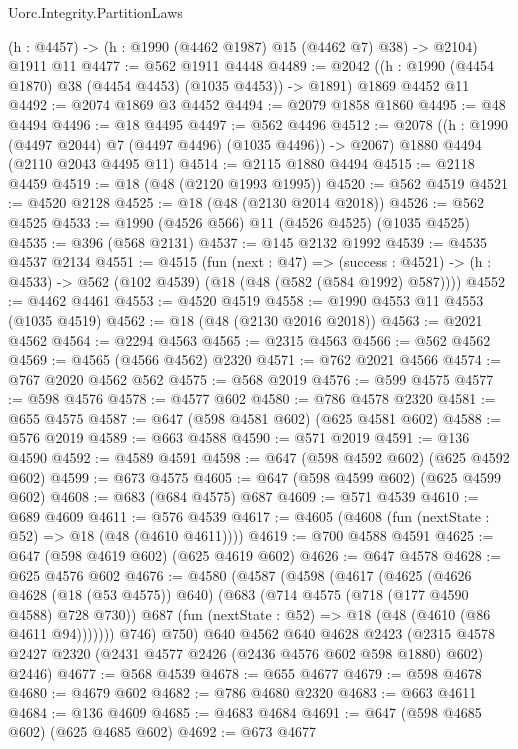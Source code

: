 \begin{lexlean}{Uorc.Integrity.PartitionLaws}
\begin{coremodule}
    (h : @4457) -> (h : @1990 (@4462 @1987) @15 (@4462 @7) @38) -> @2104)
    @1911
    @11
@4477 := @562 @1911 @4448
@4489 := @2042 ((h : @1990 (@4454 @1870) @38 (@4454 @4453) (@1035 @4453)) -> @1891) @1869 @4452 @11
@4492 := @2074 @1869 @3 @4452
@4494 := @2079 @1858 @1860
@4495 := @48 @4494
@4496 := @18 @4495
@4497 := @562 @4496
@4512 := @2078
    ((h : @1990 (@4497 @2044) @7 (@4497 @4496) (@1035 @4496)) -> @2067)
    @1880
    @4494
    (@2110 @2043 @4495 @11)
@4514 := @2115 @1880 @4494
@4515 := @2118 @4459
@4519 := @18 (@48 (@2120 @1993 @1995))
@4520 := @562 @4519
@4521 := @4520 @2128
@4525 := @18 (@48 (@2130 @2014 @2018))
@4526 := @562 @4525
@4533 := @1990 (@4526 @566) @11 (@4526 @4525) (@1035 @4525)
@4535 := @396 (@568 @2131)
@4537 := @145 @2132 @1992
@4539 := @4535 @4537 @2134
@4551 := @4515
    (fun (next : @47) =>
    (success : @4521) -> (h : @4533) -> @562 (@102 @4539) (@18 (@48 (@582 (@584 @1992) @587))))
@4552 := @4462 @4461
@4553 := @4520 @4519
@4558 := @1990 @4553 @11 @4553 (@1035 @4519)
@4562 := @18 (@48 (@2130 @2016 @2018))
@4563 := @2021 @4562
@4564 := @2294 @4563
@4565 := @2315 @4563
@4566 := @562 @4562
@4569 := @4565 (@4566 @4562) @2320
@4571 := @762 @2021 @4566
@4574 := @767 @2020 @4562 @562
@4575 := @568 @2019
@4576 := @599 @4575
@4577 := @598 @4576
@4578 := @4577 @602
@4580 := @786 @4578 @2320
@4581 := @655 @4575
@4587 := @647 (@598 @4581 @602) (@625 @4581 @602)
@4588 := @576 @2019
@4589 := @663 @4588
@4590 := @571 @2019
@4591 := @136 @4590
@4592 := @4589 @4591
@4598 := @647 (@598 @4592 @602) (@625 @4592 @602)
@4599 := @673 @4575
@4605 := @647 (@598 @4599 @602) (@625 @4599 @602)
@4608 := @683 (@684 @4575) @687
@4609 := @571 @4539
@4610 := @689 @4609
@4611 := @576 @4539
@4617 := @4605 (@4608 (fun (nextState : @52) => @18 (@48 (@4610 @4611))))
@4619 := @700 @4588 @4591
@4625 := @647 (@598 @4619 @602) (@625 @4619 @602)
@4626 := @647 @4578
@4628 := @625 @4576 @602
@4676 := @4580
    (@4587
      (@4598
        (@4617
          (@4625
            (@4626 @4628 (@18 (@53 @4575)) @640)
            (@683
              (@714 @4575 (@718 (@177 @4590 @4588) @728 @730))
              @687
              (fun (nextState : @52) => @18 (@48 (@4610 (@86 @4611 @94)))))))
        @746)
      @750)
    @640
    @4562
    @640
    @4628
    @2423
    (@2315 @4578 @2427 @2320 (@2431 @4577 @2426 (@2436 @4576 @602 @598 @1880) @602) @2446)
@4677 := @568 @4539
@4678 := @655 @4677
@4679 := @598 @4678
@4680 := @4679 @602
@4682 := @786 @4680 @2320
@4683 := @663 @4611
@4684 := @136 @4609
@4685 := @4683 @4684
@4691 := @647 (@598 @4685 @602) (@625 @4685 @602)
@4692 := @673 @4677

\end{coremodule}
\end{lexlean}

